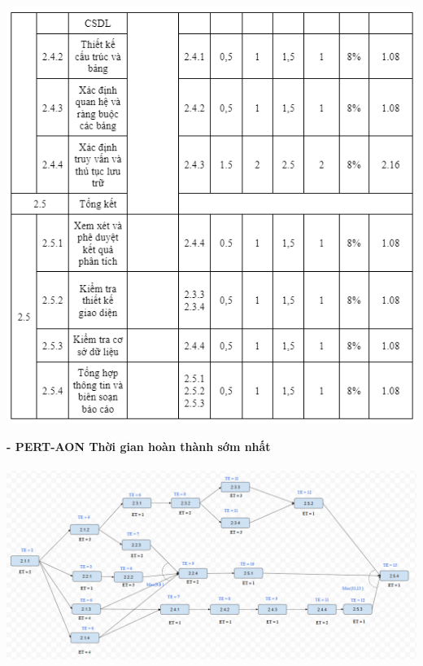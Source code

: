 \documentclass[12pt]{article}
\begin{document}
\par
\includegraphics[width=14.5cm]{ThoiGian2_3.png}
\vspace{0.5cm}

\hspace{1cm}\textbf{- PERT-AON Thời gian hoàn thành sớm nhất \\\\} 
\vspace*{0.5cm}    
\hspace{0.7cm}\includegraphics[width=14.5cm]{PERT2_1.png}
\vspace{0.5cm}  
\end{document}
